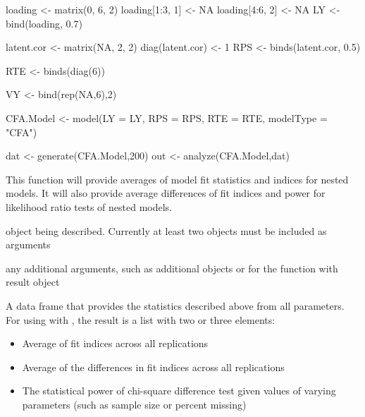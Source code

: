 \documentclass[a4paper]{book}
\begin{document}
%
\begin{Examples}
\begin{ExampleCode}
loading <- matrix(0, 6, 2)
loading[1:3, 1] <- NA
loading[4:6, 2] <- NA
LY <- bind(loading, 0.7)

latent.cor <- matrix(NA, 2, 2)
diag(latent.cor) <- 1
RPS <- binds(latent.cor, 0.5)

RTE <- binds(diag(6))

VY <- bind(rep(NA,6),2)

CFA.Model <- model(LY = LY, RPS = RPS, RTE = RTE, modelType = "CFA")

dat <- generate(CFA.Model,200)
out <- analyze(CFA.Model,dat)
\end{ExampleCode}
\end{Examples}
%
\begin{Description}\relax
This function will provide averages of model fit statistics and indices for nested models. It will also provide average differences of fit indices and power for likelihood ratio tests of nested models.
\end{Description}
%
\begin{Arguments}
\begin{ldescription}
\item[\code{object}] 
 object being described. Currently at least two objects must be included as arguments

\item[\code{...}] 
any additional arguments, such as additional objects or for the function with result object

\end{ldescription}
\end{Arguments}
%
\begin{Value}
A data frame that provides the statistics described above from all parameters.
For using with , the result is a list with two or three elements:
\begin{itemize}

\item {} Average of fit indices across all replications
\item {} Average of the differences in fit indices across all replications
\item {} The statistical power of chi-square difference test given values of varying parameters (such as sample size or percent missing) 

\end{itemize}

\end{Value}
\end{document}
